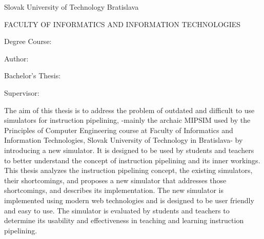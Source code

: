 \begin{minipage}[t]{1\columnwidth}%
Slovak University of Technology Bratislava 

FACULTY OF INFORMATICS AND INFORMATION TECHNOLOGIES

Degree Course: \myStudyProgram
\newline

Author: \myName

Bachelor’s Thesis: \myTitle

Supervisor: \mySupervisor

\myDate%
\end{minipage}

\bigskip{}

The aim of this thesis is to address the problem of outdated and difficult to use simulators for instruction pipelining, -mainly the archaic MIPSIM used by the Principles of Computer Engineering course at Faculty of Informatics and Information Technologies, Slovak University of Technology in Bratislava- by introducing a new simulator. It is designed to be used by students and teachers to better understand the concept of instruction pipelining and its inner workings. This thesis analyzes the instruction pipelining concept, the existing simulators, their shortcomings, and proposes a new simulator that addresses those shortcomings, and describes its implementation. The new simulator is implemented using modern web technologies and is designed to be user friendly and easy to use. The simulator is evaluated by students and teachers to determine its usability and effectiveness in teaching and learning instruction pipelining.

\newpage{}


\thispagestyle{empty}
\mbox{}
\newpage

